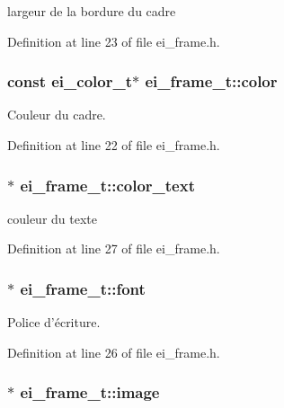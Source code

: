largeur de la bordure du cadre 



Definition at line 23 of file ei\-\_\-frame.\-h.

\hypertarget{structei__frame__t_afd5c5dd800d9f24a52345093ba053185}{
\subsubsection[{color}]{\setlength{\rightskip}{0pt plus 5cm}const {\bf ei\-\_\-color\-\_\-t}$\ast$ ei\-\_\-frame\-\_\-t\-::color}}\label{structei__frame__t_afd5c5dd800d9f24a52345093ba053185}


Couleur du cadre. 



Definition at line 22 of file ei\-\_\-frame.\-h.

\hypertarget{structei__frame__t_a8cc4e775e95a608a43ef23b56b94230b}{
\subsubsection[{color\-\_\-text}]{$\ast$ ei\-\_\-frame\-\_\-t\-::color\-\_\-text}}\label{structei__frame__t_a8cc4e775e95a608a43ef23b56b94230b}


couleur du texte 



Definition at line 27 of file ei\-\_\-frame.\-h.

\hypertarget{structei__frame__t_a4b28984e401b435c7232271fd36af2a8}{
\subsubsection[{font}]{$\ast$ ei\-\_\-frame\-\_\-t\-::font}}\label{structei__frame__t_a4b28984e401b435c7232271fd36af2a8}


Police d'écriture. 



Definition at line 26 of file ei\-\_\-frame.\-h.

\hypertarget{structei__frame__t_a2b7a1d80abca97ca7e0a6874e48d6c0a}{
\subsubsection[{image}]{$\ast$ ei\-\_\-frame\-\_\-t\-::image}}\label{structei__frame__t_a2b7a1d80abca97ca7e0a6874e48d6c0a}


